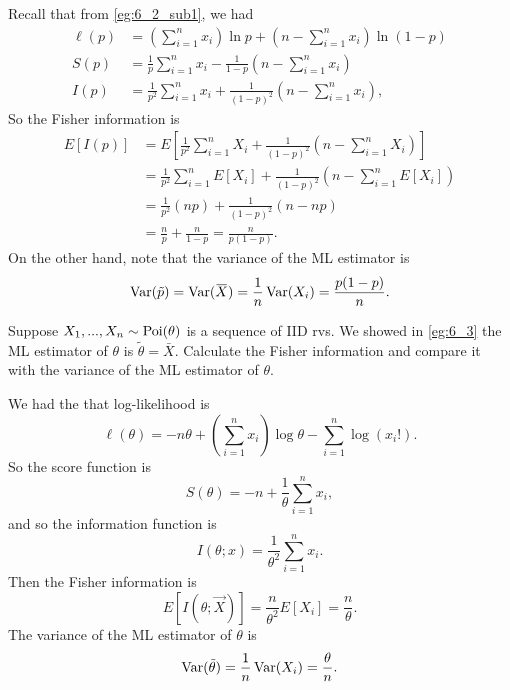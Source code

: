 \documentclass[notoc,notitlepage]{tufte-book}
\begin{document}
\begin{solution}
  Recall that from \cref{eg:6_2_sub1}, we had
  \begin{align*}
    \ell(p) &= \left( \sum_{i=1}^{n} x_i \right) \ln p + \left( n - \sum_{i=1}^{n} x_i \right) \ln ( 1 - p ) \\
    S(p) &= \frac{1}{p} \sum_{i=1}^{n} x_i - \frac{1}{1 - p} \left( n - \sum_{i=1}^{n} x_i \right) \\
    I(p) &= \frac{1}{p^2} \sum_{i=1}^{n} x_i + \frac{1}{(1 - p)^2} \left( n - \sum_{i=1}^{n} x_i \right),
  \end{align*}
  So the Fisher information is
  \begin{align*}
    E[ I(p) ] &= E\left[ \frac{1}{p^2} \sum_{i=1}^{n} X_i + \frac{1}{(1 - p)^2} \left( n - \sum_{i=1}^{n} X_i \right) \right] \\
              &= \frac{1}{p^2} \sum_{i=1}^{n} E[X_i] + \frac{1}{(1 - p)^2} \left( n - \sum_{i=1}^{n} E[X_i] \right) \\
              &= \frac{1}{p^2} ( np ) + \frac{1}{(1 - p)^2} ( n - np ) \\
              &= \frac{n}{p} + \frac{n}{1 - p} = \frac{n}{p ( 1 - p )}.
  \end{align*}
  On the other hand, note that the variance of the ML estimator is
  \begin{equation*}
    \Var(\tilde{p}) = \Var(\bar{X}) = \frac{1}{n} \Var(X_i) = \frac{p( 1 - p )}{n}.
  \end{equation*}
\end{solution}

\begin{eg}
  Suppose $X_1, ..., X_n \sim \operatorname{Poi}(\theta)$ is a sequence of IID rvs. We showed in \cref{eg:6_3} the ML estimator of $\theta$ is $\tilde{\theta} = \bar{X}$. Calculate the Fisher information and compare it with the variance of the ML estimator of $\theta$.
\end{eg}

\begin{solution}
  We had the that log-likelihood is
  \begin{equation*}
    \ell(\theta) = -n \theta + \left( \sum_{i=1}^{n} x_i \right) \log \theta - \sum_{i=1}^{n} \log (x_i!).
  \end{equation*}
  So the score function is
  \begin{equation*}
    S(\theta) = -n + \frac{1}{\theta} \sum_{i=1}^{n} x_i,
  \end{equation*}
  and so the information function is
  \begin{equation*}
    I(\theta; x) = \frac{1}{\theta^2} \sum_{i=1}^{n} x_i.
  \end{equation*}
  Then the Fisher information is
  \begin{equation*}
    E[ I(\theta; \vec{X}) ] = \frac{n}{\theta^2} E[X_i] = \frac{n}{\theta}.
  \end{equation*}
  The variance of the ML estimator of $\theta$ is
  \begin{equation*}
    \operatorname{Var}(\tilde{\theta}) = \frac{1}{n} \operatorname{Var}(X_i) = \frac{\theta}{n}.
  \end{equation*}
\end{solution}
\end{document}
